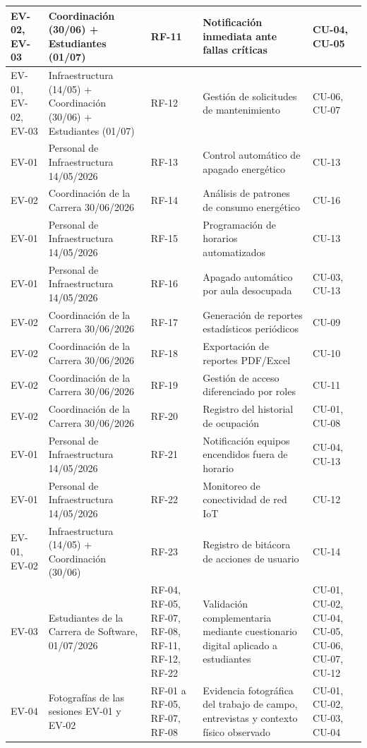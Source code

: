 \begin{longtable}{|P{0.2000}|P{0.2000}|P{0.2000}|P{0.2000}|P{0.2000}|}
EV-02, EV-03 & Coordinación (30/06) + Estudiantes (01/07) & RF-11 & Notificación inmediata ante fallas críticas & CU-04, CU-05 \\ \hline
EV-01, EV-02, EV-03 & Infraestructura (14/05) + Coordinación (30/06) + Estudiantes (01/07) & RF-12 & Gestión de solicitudes de mantenimiento & CU-06, CU-07 \\ \hline
EV-01 & Personal de Infraestructura 14/05/2026 & RF-13 & Control automático de apagado energético & CU-13 \\ \hline
EV-02 & Coordinación de la Carrera 30/06/2026 & RF-14 & Análisis de patrones de consumo energético & CU-16 \\ \hline
EV-01 & Personal de Infraestructura 14/05/2026 & RF-15 & Programación de horarios automatizados & CU-13 \\ \hline
EV-01 & Personal de Infraestructura 14/05/2026 & RF-16 & Apagado automático por aula desocupada & CU-03, CU-13 \\ \hline
EV-02 & Coordinación de la Carrera 30/06/2026 & RF-17 & Generación de reportes estadísticos periódicos & CU-09 \\ \hline
EV-02 & Coordinación de la Carrera 30/06/2026 & RF-18 & Exportación de reportes PDF/Excel & CU-10 \\ \hline
EV-02 & Coordinación de la Carrera 30/06/2026 & RF-19 & Gestión de acceso diferenciado por roles & CU-11 \\ \hline
EV-02 & Coordinación de la Carrera 30/06/2026 & RF-20 & Registro del historial de ocupación & CU-01, CU-08 \\ \hline
EV-01 & Personal de Infraestructura 14/05/2026 & RF-21 & Notificación equipos encendidos fuera de horario & CU-04, CU-13 \\ \hline
EV-01 & Personal de Infraestructura 14/05/2026 & RF-22 & Monitoreo de conectividad de red IoT & CU-12 \\ \hline
EV-01, EV-02 & Infraestructura (14/05) + Coordinación (30/06) & RF-23 & Registro de bitácora de acciones de usuario & CU-14 \\ \hline
EV-03 & Estudiantes de la Carrera de Software, 01/07/2026 & RF-04, RF-05, RF-07, RF-08, RF-11, RF-12, RF-22 & Validación complementaria mediante cuestionario digital aplicado a estudiantes & CU-01, CU-02, CU-04, CU-05, CU-06, CU-07, CU-12 \\ \hline
EV-04 & Fotografías de las sesiones EV-01 y EV-02 & RF-01 a RF-05, RF-07, RF-08 & Evidencia fotográfica del trabajo de campo, entrevistas y contexto físico observado & CU-01, CU-02, CU-03, CU-04 \\ \hline

\end{longtable}
